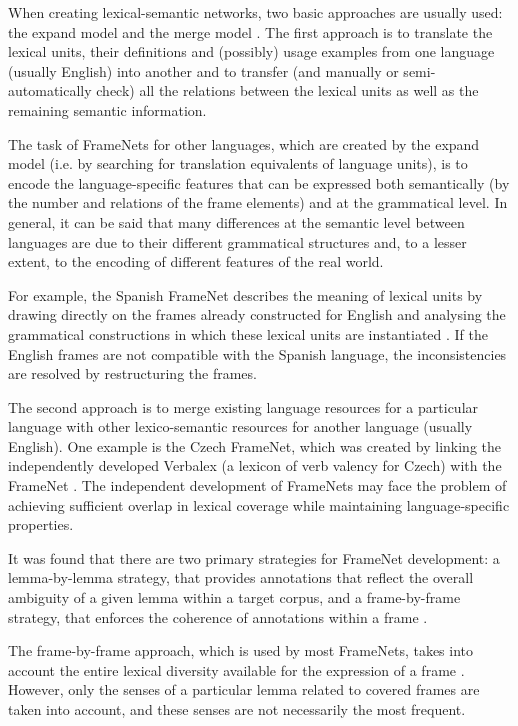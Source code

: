 \documentclass[output=paper,colorlinks,citecolor=brown]{langscibook}
\begin{document}
When creating lexical-semantic networks, two basic approaches are usually used: the expand model and the merge model \citep[716]{vossen1996right}.  The first approach is to translate the lexical units, their definitions and (possibly) usage examples from one language (usually English) into another and to transfer (and manually or semi-automatically check) all the relations between the lexical units as well as the remaining semantic information.

The task of FrameNets for other languages, which are created by the expand model (i.e. by searching for translation equivalents of language units), is to encode the language-specific features that can be expressed both semantically (by the number and relations of the frame elements) and at the grammatical level. In general, it can be said that many differences at the semantic level between languages are due to their different grammatical structures and, to a lesser extent, to the encoding of different features of the real world.

For example, the Spanish FrameNet describes the meaning of lexical units by drawing directly on the frames already constructed for English and analysing the grammatical constructions in which these lexical units are instantiated \citep[136]{Subirats+2009+135+162}.  If the English frames are not compatible with the Spanish language, the inconsistencies are resolved by restructuring the frames.

The second approach is to merge existing language resources for a particular language with other lexico-semantic resources for another language (usually English). One example is the Czech FrameNet, which was created by linking the independently developed Verbalex (a lexicon of verb valency for Czech) with the FrameNet \citep{materna-pala-2010-using}. The independent development of FrameNets may face the problem of achieving sufficient overlap in lexical coverage while maintaining language-specific properties.

It was found that there are two primary strategies for FrameNet development: a lemma-by-lemma strategy, that provides annotations that reflect the overall ambiguity of a given lemma within a target corpus, and a frame-by-frame strategy, that enforces the coherence of annotations within a frame \citep[1373]{candito-etal-2014-developing}.

The frame-by-frame approach, which is used by most FrameNets, takes into account the entire lexical diversity available for the expression of a frame \citep[1373]{candito-etal-2014-developing}. However, only the senses of a particular lemma related to covered frames are taken into account, and these senses are not necessarily the most frequent.
\end{document}

